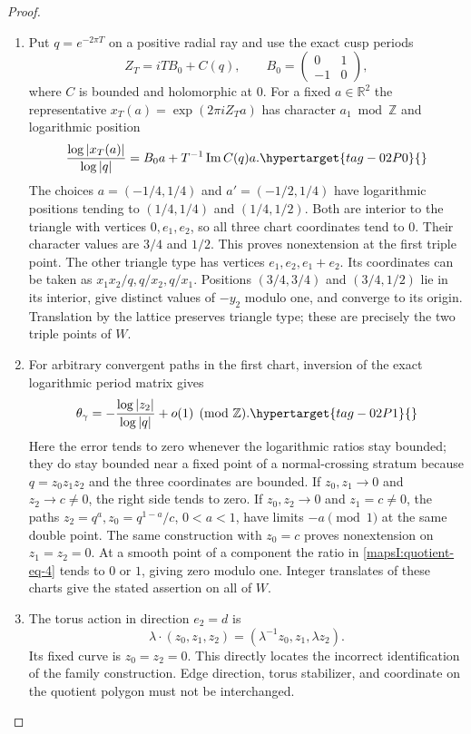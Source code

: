 \begin{proof}
\begin{enumerate}[label=\arabic*.,leftmargin=*]
\item Put $q=e^{-2\pi T}$ on a positive radial ray and use the exact
cusp periods
\[
 Z_T=iTB_0+C(q),\qquad
 B_0=\begin{pmatrix}0&1\\-1&0\end{pmatrix},
\]
where $C$ is bounded and holomorphic at $0$.  For a fixed
$a\in\mathbb R^2$ the representative
$x_T(a)=\exp(2\pi iZ_Ta)$ has character $a_1\bmod\mathbb Z$ and
logarithmic position
\[
 \frac{\log|x_T(a)|}{\log|q|}
 =B_0a+T^{-1}\operatorname{Im}C(q)a.
 \hypertarget{tag-02P0}{}\label{mapsI:quotient-eq-3}
\]
The choices $a=(-1/4,1/4)$ and $a'=(-1/2,1/4)$ have logarithmic
positions tending to $(1/4,1/4)$ and $(1/4,1/2)$.
Both are interior to the triangle with vertices $0,e_1,e_2$,
so all three chart coordinates tend to $0$.  Their character
values are $3/4$ and $1/2$.  This proves nonextension at the
first triple point.  The other triangle type has vertices
$e_1,e_2,e_1+e_2$.  Its coordinates can be taken as
$x_1x_2/q,q/x_2,q/x_1$.  Positions $(3/4,3/4)$ and
$(3/4,1/2)$ lie in its interior, give distinct values of $-y_2$
modulo one, and converge to its origin.  Translation by the
lattice preserves triangle type; these are precisely the two
triple points of $W$.

\item For arbitrary convergent paths in the first chart, inversion
of the exact logarithmic period matrix gives
\[
 \theta_\gamma=-\frac{\log|z_2|}{\log|q|}+o(1)\pmod{\mathbb Z}.
 \hypertarget{tag-02P1}{}\label{mapsI:quotient-eq-4}
\]
Here the error tends to zero whenever the logarithmic ratios
stay bounded; they do stay bounded near a fixed point of a
normal-crossing stratum because $q=z_0z_1z_2$ and the three
coordinates are bounded.  If $z_0,z_1\to0$ and $z_2\to c\ne0$,
the right side tends to zero.  If $z_0,z_2\to0$ and $z_1=c\ne0$,
the paths $z_2=q^a,z_0=q^{1-a}/c$, $0<a<1$, have limits
$-a\pmod1$ at the same double point.  The same construction
with $z_0=c$ proves nonextension on $z_1=z_2=0$.
At a smooth point of a component the ratio in \eqref{mapsI:quotient-eq-4} tends
to $0$ or $1$, giving zero modulo one.  Integer translates
of these charts give the stated assertion on all of $W$.

\item The torus action in direction $e_2=d$ is
\[
 \lambda\cdot(z_0,z_1,z_2)
       =(\lambda^{-1}z_0,z_1,\lambda z_2).
\]
Its fixed curve is $z_0=z_2=0$.  This directly locates the
incorrect identification of the family construction.  Edge direction,
torus stabilizer, and coordinate on the quotient polygon must
not be interchanged.
\end{enumerate}
\end{proof}

